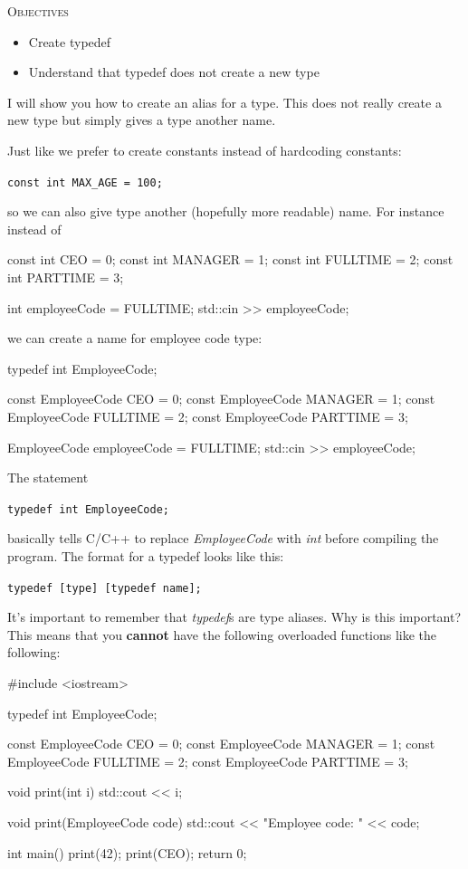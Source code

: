 \newpage{}

\textsc{Objectives}
\begin{itemize}
\item Create typedef
\item Understand that typedef does not create a new type
\end{itemize}

I will show you how to create an alias for a type. This does not really
create a new type but simply gives a type another name.


\newpage{}

Just like we prefer to create constants instead of hardcoding constants:

\verb!const int MAX_AGE = 100;!

so we can also give type another (hopefully more readable) name. For
instance instead of

\begin{consolethree}[escapeinside=||]
const int CEO = 0;
const int MANAGER = 1;
const int FULLTIME = 2;
const int PARTTIME = 3;

int employeeCode = FULLTIME;
std::cin >> employeeCode;
\end{consolethree}

we can create a name for employee code type:

\begin{consolethree}[escapeinside=||]
typedef int EmployeeCode;

const EmployeeCode CEO = 0;
const EmployeeCode MANAGER = 1;
const EmployeeCode FULLTIME = 2;
const EmployeeCode PARTTIME = 3;

EmployeeCode employeeCode = FULLTIME;
std::cin >> employeeCode;
\end{consolethree}

The statement

\verb!typedef int EmployeeCode;!

basically tells C/C++ to replace \textit{EmployeeCode} with \textit{int}
before compiling the program. The format for a typedef looks like this:

\verb!typedef [type] [typedef name];!


It's important to remember that \textit{typedef}s are type
aliases. Why is this important? This means that you \textbf{cannot} have
the following overloaded functions like the following:

\begin{consolethree}[escapeinside=||]
#include <iostream>

typedef int EmployeeCode;

const EmployeeCode CEO = 0;
const EmployeeCode MANAGER = 1;
const EmployeeCode FULLTIME = 2;
const EmployeeCode PARTTIME = 3;

void print(int i)
{
    std::cout << i;
}

void print(EmployeeCode code)
{
    std::cout << "Employee code: " << code;
}

int main()
{
    print(42);
    print(CEO);
    return 0;
}
\end{consolethree}

